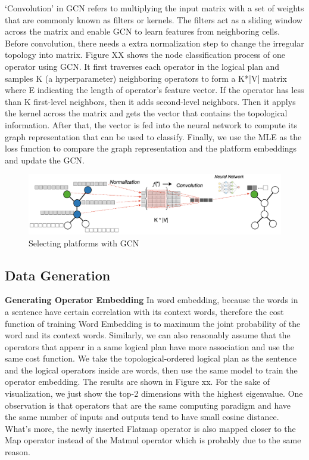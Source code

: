 ‘Convolution’ in GCN refers to multiplying the input matrix with a set of weights that are commonly known as filters or kernels. 
The filters act as a sliding window across the matrix and enable GCN to learn features from neighboring cells. 
Before convolution, there needs a extra normalization step to change the irregular topology into matrix. 
Figure XX shows the node classification process of one operator using GCN. 
It first traverses each operator in the logical plan and samples K (a hyperparameter) neighboring operators to form a K*|V| matrix where E indicating the length of operator's feature vector. 
If the operator has less than K first-level neighbors, then it adds second-level neighbors. 
Then it applys the kernel across the matrix and gets the vector that contains the topological information. 
After that, the vector is fed into the neural network to compute its graph representation that can be used to classify. 
Finally, we use the MLE as the loss function to compare the graph representation and the platform embeddings and update the GCN.


\begin{figure}
  \centering
  \includegraphics[width=\linewidth]{figures/gcn.png}
  \caption{Selecting platforms with GCN}
  \label{fig:gcn}
\end{figure}

\subsection{Data Generation}
\textbf{Generating Operator Embedding}
In word embedding, because the words in a sentence have certain correlation with its context words, 
therefore the cost function of training Word Embedding is to maximum the joint probability of the word and its context words. 
Similarly, we can also reasonably assume that the operators that appear in a same logical plan have more association and use the same cost function. 
We take the topological-ordered logical plan as the sentence and the logical operators inside are words, 
then use the same model to train the operator embedding. The results are shown in Figure xx. 
For the sake of visualization, we just show the top-2 dimensions with the highest eigenvalue. 
One observation is that operators that are the same computing paradigm and have the same number of inputs and outputs tend to have small cosine distance. 
What's more, the newly inserted Flatmap operator is also mapped closer to the Map operator instead of the Matmul operator which is probably due to the same reason.

